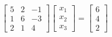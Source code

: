 \documentclass[preview]{standalone}
\begin{document}
\begin{align*}
\begin{bmatrix}5 & 2 & -1 \\1 & 6 & -3 \\2 & 1 & 4\end{bmatrix}\begin{bmatrix} x_1 \\ x_2 \\ x_3 \end{bmatrix}= \begin{bmatrix} 6 \\ 4 \\ 2 \end{bmatrix}
\end{align*}
\end{document}
